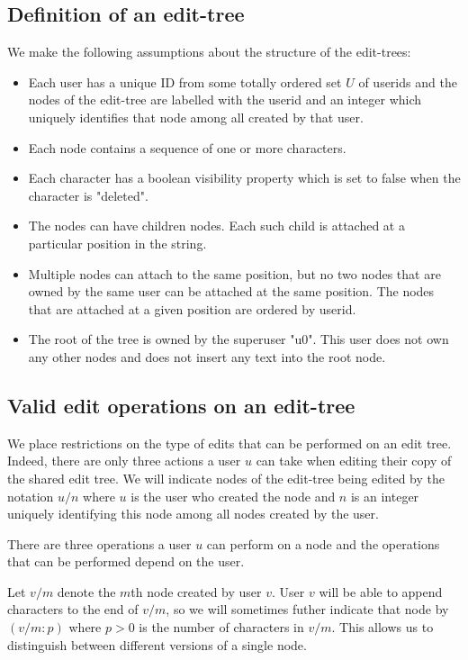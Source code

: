 \documentclass{amsart}
\begin{document}
\subsection{Definition of an edit-tree}
We make the following assumptions about the structure of the edit-trees:
\begin{itemize}
\item Each user has a unique ID from some totally ordered set $U$ of userids 
and the nodes of the edit-tree 
are labelled with the userid and an integer which uniquely identifies
that node among all created by that user.
\item Each node contains a sequence of one or more characters.
\item Each character has a boolean visibility property which is set
to false when the character is "deleted". 
\item The nodes can have children nodes.
Each such child is attached at a particular position in the string.
\item Multiple nodes can attach to the same position, but no two nodes that are owned by the 
same user can be attached at the same position. The nodes that are attached at
a given position are ordered by userid. 
\item The root of the tree is owned by the
superuser "u0". This user does not own any other nodes and does not insert any
text into the root node. 
\end{itemize}

\subsection{Valid edit operations on an edit-tree}
We place restrictions on the type of edits that can be performed
on an edit tree. Indeed, there are only three actions a user $u$ can take
when editing their copy of the shared edit tree. We will indicate nodes 
of the edit-tree being edited by
the notation $u/n$ where $u$ is the user who created the node and $n$ is an
integer uniquely identifying this node among all nodes created by the user.

There are three operations a user $u$ can perform on a node and the operations
that can be performed depend on the user.

Let $v/m$ denote the $m$th node created by user $v$.
User $v$ will be able to append characters to the end of $v/m$, so 
we will sometimes futher indicate that node by $(v/m:p)$
where $p>0$ is the number of characters in $v/m$. This allows us to
distinguish between different versions of a single node.
\end{document}
